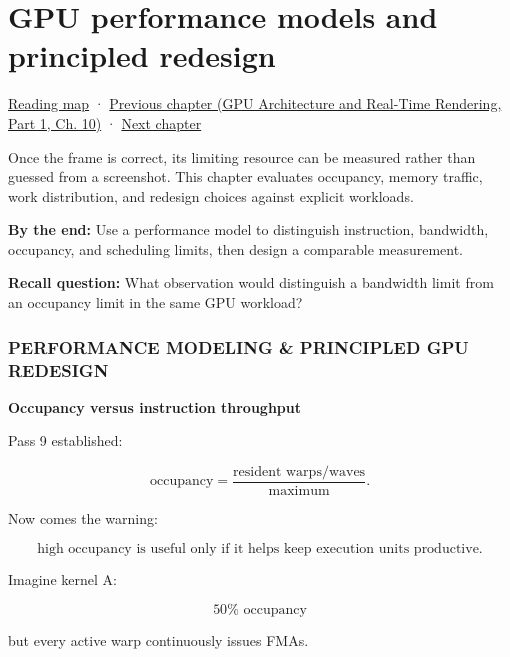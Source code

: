 \chapter{GPU performance models and principled redesign}\label{05-engine-i-ch020-gpu-performance-models-and-principled-redesign}\hypertarget{05-engine-i-ch020}{}\label{stagechapter:05-engine-i-ch020}

\hypertarget{05-engine-i-ch020-gpu-performance-models-and-principled-redesign}{}

\hyperref[volume-reading-map]{Reading map} · \href{../06-GPU-Architecture-and-Real-Time-Rendering-P01/main.pdf\#nameddest=05-engine-i-ch019-gpu-work-and-reusable-metal-frames}{Previous chapter (GPU Architecture and Real-Time Rendering, Part 1, Ch. 10)} · \hyperref[05-engine-i-ch021-buffers-images-memory-and-uploads]{Next chapter}

Once the frame is correct, its limiting resource can be measured rather than guessed from a screenshot. This chapter evaluates occupancy, memory traffic, work distribution, and redesign choices against explicit workloads.

\textbf{By the end:} Use a performance model to distinguish instruction, bandwidth, occupancy, and scheduling limits, then design a comparable measurement.

\textbf{Recall question:} What observation would distinguish a bandwidth limit from an occupancy limit in the same GPU workload?

\subsection{PERFORMANCE MODELING \& PRINCIPLED GPU REDESIGN}\label{05-engine-i-ch020-performance-modeling-principled-gpu-redesign}

\hypertarget{05-engine-i-ch020-performance-modeling-principled-gpu-redesign}{}

\textbf{Occupancy versus instruction throughput}

Pass 9 established:

\[
\text{occupancy}
=
\frac{
\text{resident warps/waves}
}{
\text{maximum}
}.
\]

Now comes the warning:

\[
\boxed{
\text{high occupancy is useful only if it helps keep execution units productive}.
}
\]

Imagine kernel A:

\[
50\%\text{ occupancy}
\]

but every active warp continuously issues FMAs.

